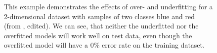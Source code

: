 \begin{figure}[ht]
  
  \begin{center}
    \end{center}
  
  \caption[Overfitting Example]{This example demonstrates the effects of over- and underfitting for a 2-dimensional dataset with samples of two classes blue and red (from \cite{icke2008Overfitting}, edited). We can see, that neither the underfitted nor the overfitted models will work well on test data, even though the overfitted model will have a 0\% error rate on the training dataset.}
  \label{fig:Overfitting}
\end{figure}

